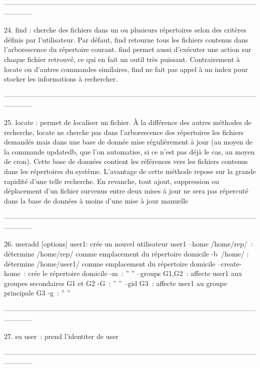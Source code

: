 \documentclass[a4paper, 10pt, onecolumn, openright, oneside]{book}
\begin{document}
------------------------------------------------------------------------------------------------------------------------

    24. find : cherche des fichiers dans un ou plusieurs répertoires selon des critères définis par l'utilisateur. 
Par défaut, find retourne tous les fichiers contenus dans l'arborescence du répertoire courant. find permet aussi d'exécuter une action sur chaque fichier retrouvé, ce qui en fait un outil très puissant. Contrairement à locate ou d'autres commandes similaires, find ne fait pas appel à un index pour stocker les informations à rechercher. 

------------------------------------------------------------------------------------------------------------------------

    25. locate : permet de localiser un fichier. À la différence des autres méthodes de recherche, locate ne cherche pas dans l'arborescence des répertoires les fichiers demandés mais dans une base de donnée mise régulièrement à jour (au moyen de la commande updatedb, que l'on automatise, si ce n'est pas déjà le cas, au moyen de cron). Cette base de données contient les références vers les fichiers contenus dans les répertoires du système. 
L'avantage de cette méthode repose sur la grande rapidité d'une telle recherche. En revanche, tout ajout, suppression ou déplacement d'un fichier survenus entre deux mises à jour ne sera pas répercuté dans la base de données à moins d'une mise à jour manuelle

------------------------------------------------------------------------------------------------------------------------

    26. useradd [options] user1: crée un nouvel utilisateur user1
--home /home/rep/ : détermine /home/rep/ comme emplacement du répertoire domicile
-b /home/ : détermine /home/user1/ comme emplacement du répertoire domicile
--create-home : crée le répertoire domicile 
-m :                                ''               ''
--groups G1,G2 : affecte user1 aux groupes secondaires G1 et G2 
-G :                                        ''                        ''
--gid G3 : affecte user1 au groupe principale G3 
-g :                   ''                           ''

------------------------------------------------------------------------------------------------------------------------

    27. su user : prend l'identiter de user

------------------------------------------------------------------------------------------------------------------------
\end{document}
